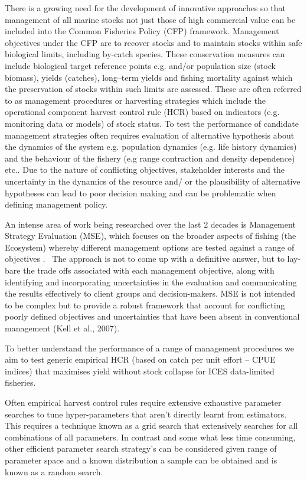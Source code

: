 \documentclass[preprint,12pt]{elsarticle}
\begin{document}
There is a growing need for the development of innovative approaches so that management of all marine stocks not just those of high commercial value can be included into the Common Fisheries Policy (CFP) framework. Management objectives under the CFP are to recover stocks and to maintain stocks within safe biological limits, including by-catch species. These conservation measures can include biological target reference points e.g. and/or population size (stock biomass), yields (catches), long–term yields and fishing mortality against which the preservation of stocks within such limits are assessed. These are often referred to as management procedures or harvesting strategies which include the operational component harvest control rule (HCR) based on indicators (e.g. monitoring data or models) of stock status. To test the performance of candidate management strategies often requires evaluation of alternative hypothesis about the dynamics of the system e.g. population dynamics (e.g. life history dynamics) and the behaviour of the fishery (e.g range contraction and density dependence) etc..  Due to the nature of conflicting objectives, stakeholder interests and the uncertainty in the dynamics of the resource and/ or the plausibility of alternative hypotheses can lead to poor decision making and can be problematic when defining management policy.

An intense area of work being researched over the last 2 decades is Management Strategy Evaluation (MSE), which focuses on the broader aspects of fishing (the Ecosystem) whereby different management options are tested against a range of objectives \cite{kell2007flr}.  The approach is not to come up with a definitive answer, but to lay-bare the trade offs associated with each management objective, along with identifying and incorporating uncertainties in the evaluation and communicating the results effectively to client groups and decision-makers. MSE is not intended to be complex but to provide a robust framework that account for conflicting poorly defined objectives and uncertainties that have been absent in conventional management (Kell et al., 2007).  

To better understand the performance of a range of management procedures we aim to test generic empirical HCR (based on catch per unit effort – CPUE indices) that maximises yield without stock collapse for ICES data-limited fisheries. 

Often empirical harvest control rules require extensive exhaustive parameter searches to tune hyper-parameters that aren’t directly learnt from estimators.  This requires a technique known as a grid search that extensively searches for all combinations of all parameters. In contrast and some what less time consuming, other efficient parameter search strategy’s can be considered given range of parameter space and a known distribution a sample can be obtained and is known as a random search.  
\end{document}
